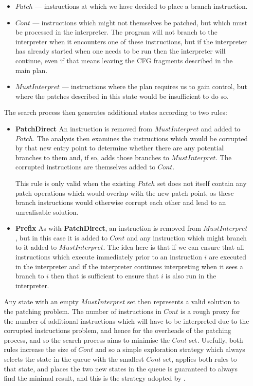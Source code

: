 \begin{itemize}
\item $Patch$ --- instructions at which we have decided to place a
  branch instruction.
\item $Cont$ --- instructions which might not themselves be patched,
  but which must be processed in the interpreter.  The program will
  not branch to the interpreter when it encounters one of these
  instructions, but if the interpreter has already started when one
  needs to be run then the interpreter will continue, even if that
  means leaving the CFG fragments described in the main plan.
\item $MustInterpret$ --- instructions where the plan requires us to
  gain control, but where the patches described in this state would be
  insufficient to do so.
\end{itemize}

The search process then generates additional states according to two
rules:

\begin{itemize}
\item
  \textbf{PatchDirect} An instruction is removed from $MustInterpret$
  and added to $Patch$.  The analysis then examines the instructions
  which would be corrupted by that new entry point to determine
  whether there are any potential branches to them and, if so, adds
  those branches to $MustInterpret$.  The corrupted instructions are
  themselves added to $Cont$.

  This rule is only valid when the existing $Patch$ set does not
  itself contain any patch operations which would overlap with the new
  patch point, as these branch instructions would otherwise corrupt
  each other and lead to an unrealisable solution.
\item
  \textbf{Prefix} As with \textbf{PatchDirect}, an instruction is
  removed from $MustInterpret$, but in this case it is added to $Cont$
  and any instruction which might branch to it added to
  $MustInterpret$.  The idea here is that if we can ensure that all
  instructions which execute immediately prior to an instruction $i$
  are executed in the interpreter and if the interpreter continues
  interpreting when it sees a branch to $i$ then that is sufficient
  to ensure that $i$ is also run in the interpreter.
\end{itemize}

Any state with an empty $MustInterpret$ set then represents a valid
solution to the patching problem.  The number of instructions in
$Cont$ is a rough proxy for the number of additional instructions
which will have to be interpreted due to the corrupted instructions
problem, and hence for the overheads of the patching process, and so
the search process aims to minimise the $Cont$ set.  Usefully, both
rules increase the size of $Cont$ and so a simple exploration strategy
which always selects the state in the queue with the smallest $Cont$
set, applies both rules to that state, and places the two new states
in the queue is guaranteed to always find the minimal result, and this
is the strategy adopted by {\implementation}.

